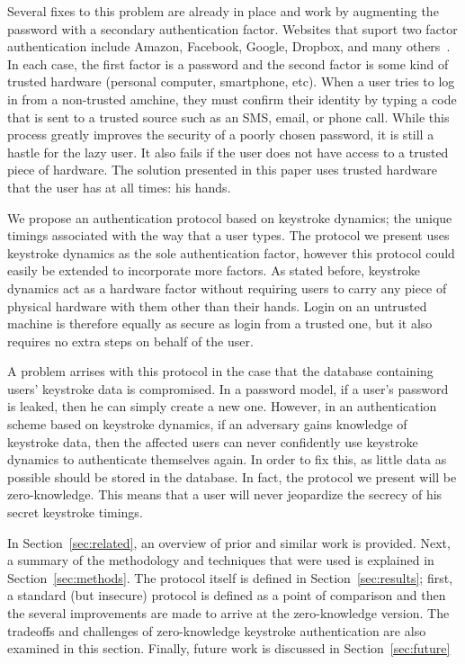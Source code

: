\documentclass[11pt]{article}
\begin{document}
Several fixes to this problem are already in place and work by augmenting the password with a secondary authentication factor. Websites that suport two factor authentication include Amazon, Facebook, Google, Dropbox, and many others~\cite{2fac}. In each case, the first factor is a password and the second factor is some kind of trusted hardware (personal computer, smartphone, etc). When a user tries to log in from a non-trusted amchine, they must confirm their identity by typing a code that is sent to a trusted source such as an SMS, email, or phone call. While this process greatly improves the security of a poorly chosen password, it is still a hastle for the lazy user. It also fails if the user does not have access to a trusted piece of hardware. The solution presented in this paper uses trusted hardware that the user has at all times: his hands.

We propose an authentication protocol based on keystroke dynamics; the unique timings associated with the way that a user types. The protocol we present uses keystroke dynamics as the sole authentication factor, however this protocol could easily be extended to incorporate more factors. As stated before, keystroke dynamics act as a hardware factor without requiring users to carry any piece of physical hardware with them other than their hands. Login on an untrusted machine is therefore equally as secure as login from a trusted one, but it also requires no extra steps on behalf of the user.

A problem arrises with this protocol in the case that the database containing users' keystroke data is compromised. In a password model, if a user's password is leaked, then he can simply create a new one. However, in an authentication scheme based on keystroke dynamics, if an adversary gains knowledge of keystroke data, then the affected users can never confidently use keystroke dynamics to authenticate themselves again. In order to fix this, as little data as possible should be stored in the database. In fact, the protocol we present will be zero-knowledge. This means that a user will never jeopardize the secrecy of his secret keystroke timings.

In Section~\ref{sec:related}, an overview of prior and similar work is provided. Next, a summary of the methodology and techniques that were used is explained in Section~\ref{sec:methods}. The protocol itself is defined in Section~\ref{sec:results}; first, a standard (but insecure) protocol is defined as a point of comparison and then the several improvements are made to arrive at the zero-knowledge version. The tradeoffs and challenges of zero-knowledge keystroke authentication are also examined in this section. Finally, future work is discussed in Section~\ref{sec:future}
\end{document}

